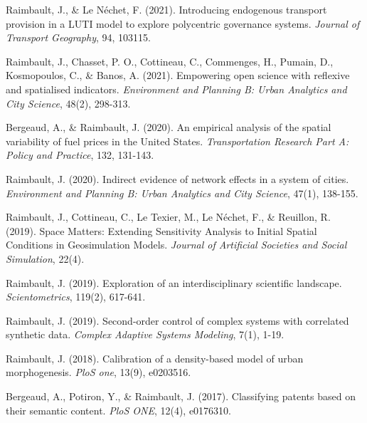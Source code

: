 %


\noindent Raimbault, J., \& Le Néchet, F. (2021). Introducing endogenous transport provision in a LUTI model to explore polycentric governance systems. \textit{Journal of Transport Geography}, 94, 103115.

\bigskip

\noindent Raimbault, J., Chasset, P. O., Cottineau, C., Commenges, H., Pumain, D., Kosmopoulos, C., \& Banos, A. (2021). Empowering open science with reflexive and spatialised indicators. \textit{Environment and Planning B: Urban Analytics and City Science}, 48(2), 298-313.

\bigskip

\noindent Bergeaud, A., \& Raimbault, J. (2020). An empirical analysis of the spatial variability of fuel prices in the United States. \textit{Transportation Research Part A: Policy and Practice}, 132, 131-143.

\bigskip

\noindent Raimbault, J. (2020). Indirect evidence of network effects in a system of cities. \textit{Environment and Planning B: Urban Analytics and City Science}, 47(1), 138-155.


\bigskip

\noindent Raimbault, J., Cottineau, C., Le Texier, M., Le Néchet, F., \& Reuillon, R. (2019). Space Matters: Extending Sensitivity Analysis to Initial Spatial Conditions in Geosimulation Models. \textit{Journal of Artificial Societies and Social Simulation}, 22(4).

\bigskip

\noindent Raimbault, J. (2019). Exploration of an interdisciplinary scientific landscape. \textit{Scientometrics}, 119(2), 617-641.

\bigskip

\noindent Raimbault, J. (2019). Second-order control of complex systems with correlated synthetic data. \textit{Complex Adaptive Systems Modeling}, 7(1), 1-19.


\bigskip

\noindent Raimbault, J. (2018). Calibration of a density-based model of urban morphogenesis. \textit{PloS one}, 13(9), e0203516.

\bigskip

\noindent Bergeaud, A., Potiron, Y., \& Raimbault, J. (2017). Classifying patents based on their semantic content. \textit{PloS ONE}, 12(4), e0176310.




